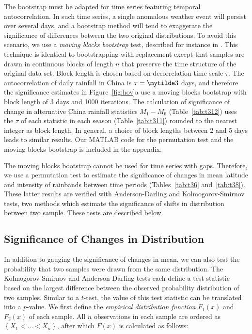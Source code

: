 \documentclass{ametsoc}
\begin{document}
	The bootstrap must be adapted for time series featuring temporal autocorrelation. In such time series, a single anomalous weather event will persist over several days, and a bootstrap method will tend to exaggerate the significance of differences between the two original distributions. To avoid this scenario, we use a \textit{moving blocks bootstrap} test, described for instance in \citet{Singh2014}. This technique is identical to bootstrapping with replacement except that samples are drawn in continuous blocks of length $n$ that preserve the time structure of the original data set. Block length is chosen based on decorrelation time scale $\tau$. The autocorrelation of daily rainfall in China is $\tau =\mytilde 3$ days, and therefore the significance estimates in Figure~\ref{fig:hov}a use a moving blocks bootstrap with block length of 3 days and 1000 iterations. The calculation of significance of change in alternative China rainfall statistics $M_1-M_6$ (Table~\ref{tab:t312}) uses the $\tau$ of each statistic in each season (Table~\ref{tab:t311}) rounded to the nearest integer as block length. In general, a choice of block lengths between 2 and 5 days leads to similar results. Our MATLAB code for the permutation test and the moving blocks bootstrap is included in the appendix.
	
	The moving blocks bootstrap cannot be used for time series with gaps. Therefore, we use a permutation test to estimate the significance of changes in mean latitude and intensity of rainbands between time periods (Tables~\ref{tab:t36} and~\ref{tab:t38}). These latter results are verified with Anderson-Darling and Kolmogorov-Smirnov tests, two methods which estimate the significance of shifts in distribution between two sample. These tests are described below.

\subsection{Significance of Changes in Distribution}

In addition to gauging the significance of changes in mean, we can also test the probability that two samples were drawn from the same distribution. The Kolmogorov-Smirnov and Anderson-Darling tests each define a test statistic based on the largest difference between the observed probability distribution of two samples. Similar to a $t$-test, the value of this test statistic can be translated into a $p$-value. We first define the \textit{empirical distribution function} $F_1(x)$ and $F_2(x)$ of each sample. All $n$ observations in each sample are ordered as $\left\{X_1 < ... < X_n\right\}$, after which $F(x)$ is calculated as follows:
\end{document}
